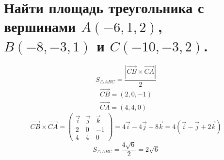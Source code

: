 \documentclass[12pt]{article}
\begin{document}
\begin{sloppypar}
    \section{Найти площадь треугольника с вершинами $A(-6, 1, 2)$, $B(-8, -3, 1)$ и $C(-10, -3, 2)$.}
    \[
        S_{\triangle ABC} = \dfrac{|\overrightarrow{CB} \times \overrightarrow{CA}|}{2}
    \]
    \[
        \begin{array}{l}
            \overrightarrow{CB} = (2, 0, -1) \\
            \overrightarrow{CA} = (4, 4, 0)
        \end{array}
    \]
    \[
        \overrightarrow{CB} \times \overrightarrow{CA} =
        \begin{pmatrix}
            \vec{i} & \vec{j} & \vec{k} \\
            2       & 0       & -1      \\
            4       & 4       & 0
        \end{pmatrix}
        = 4 \vec{i} - 4 \vec{j} + 8 \vec k = 4 (\vec i - \vec j + 2\vec k)
    \]
    \[
        S_{\triangle ABC} = \dfrac{4 \sqrt{6}}{2} = 2 \sqrt{6}
    \]



\end{sloppypar}
\end{document}
